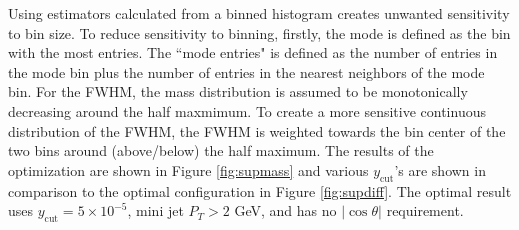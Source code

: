 Using estimators calculated from a binned histogram creates unwanted sensitivity to bin size. To reduce sensitivity to binning, firstly, the mode is defined as the bin with the most entries. The ``mode entries" is defined as the number of entries in the mode bin plus the number of entries in the nearest neighbors of the mode bin. For the FWHM, the mass distribution is assumed to be monotonically decreasing around the half maxmimum. To create a more sensitive continuous distribution of the FWHM,  the FWHM is weighted towards the bin center of the two bins around (above/below) the half maximum. The results of the optimization are shown in Figure \ref{fig:supmass} and various $y_{\text{cut}}$'s are shown in comparison to the optimal configuration in Figure \ref{fig:supdiff}. The optimal result uses $y_{\text{cut}} = 5\times 10^{-5}$, mini jet $P_T > 2$ GeV, and has no $|\cos \theta|$ requirement. 

